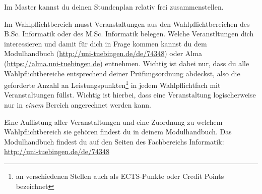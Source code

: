 Im Master kannst du deinen Stundenplan relativ frei zusammenstellen.

\iflehramt
	Im Wahlpflichtbereich musst Veranstaltungen aus den Wahlpflichtbereichen des B.Sc. Informatik oder des M.Sc. Informatik belegen. 
	Welche Veranstltungen dich interessieren und damit für dich in Frage kommen kannst du dem Modulhandbuch (\url{http://uni-tuebingen.de/de/74348}) oder Alma (\url{https://alma.uni-tuebingen.de}) entnehmen.
\else
	Wichtig ist dabei nur, dass du alle Wahlpflichtbereiche entsprechend deiner Prüfungsordnung abdeckst,
	also die geforderte Anzahl an Leistungspunkten\footnote{an verschiedenen Stellen auch als ECTS-Punkte oder Credit Points bezeichnet}
	in jedem Wahlpflichtfach mit Veranstaltungen füllst. Wichtig ist hierbei, dass eine Veranstaltung logischerweise nur in \emph{einem} Bereich angerechnet
	werden kann.

	Eine Auflistung aller Veranstaltungen und eine Zuordnung zu welchem Wahlpflichtbereich sie gehören
	findest du in deinem Modulhandbuch. Das Modulhandbuch findest du auf den Seiten des Fachbereichs Informatik: \\
	\url{http://uni-tuebingen.de/de/74348}
\fi

